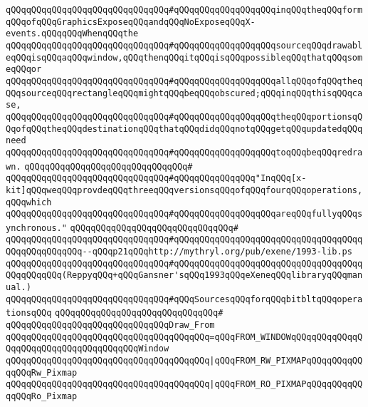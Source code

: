 \verb|qQQqqQQqqQQqqQQqqQQqqQQqqQQqqQQq#qQQqqQQqqQQqqQQqqQQqinqQQqtheqQQqformqQQqofqQQqGraphicsExposeqQQqandqQQqNoExposeqQQqX-events.qQQqqQQqWhenqQQqthe|\newline
\verb|qQQqqQQqqQQqqQQqqQQqqQQqqQQqqQQq#qQQqqQQqqQQqqQQqqQQqsourceqQQqdrawableqQQqisqQQqaqQQqwindow,qQQqthenqQQqitqQQqisqQQqpossibleqQQqthatqQQqsomeqQQqor|\newline
\verb|qQQqqQQqqQQqqQQqqQQqqQQqqQQqqQQq#qQQqqQQqqQQqqQQqqQQqallqQQqofqQQqtheqQQqsourceqQQqrectangleqQQqmightqQQqbeqQQqobscured;qQQqinqQQqthisqQQqcase,|\newline
\verb|qQQqqQQqqQQqqQQqqQQqqQQqqQQqqQQq#qQQqqQQqqQQqqQQqqQQqtheqQQqportionsqQQqofqQQqtheqQQqdestinationqQQqthatqQQqdidqQQqnotqQQqgetqQQqupdatedqQQqneed|\newline
\verb|qQQqqQQqqQQqqQQqqQQqqQQqqQQqqQQq#qQQqqQQqqQQqqQQqqQQqtoqQQqbeqQQqredrawn.|\newline
\verb|qQQqqQQqqQQqqQQqqQQqqQQqqQQqqQQq#|\newline
\verb|qQQqqQQqqQQqqQQqqQQqqQQqqQQqqQQq#qQQqqQQqqQQqqQQq"InqQQq[x-kit]qQQqweqQQqprovdeqQQqthreeqQQqversionsqQQqofqQQqfourqQQqoperations,qQQqwhich|\newline
\verb|qQQqqQQqqQQqqQQqqQQqqQQqqQQqqQQq#qQQqqQQqqQQqqQQqqQQqareqQQqfullyqQQqsynchronous."|\newline
\verb|qQQqqQQqqQQqqQQqqQQqqQQqqQQqqQQq#|\newline
\verb|qQQqqQQqqQQqqQQqqQQqqQQqqQQqqQQq#qQQqqQQqqQQqqQQqqQQqqQQqqQQqqQQqqQQqqQQqqQQqqQQqqQQq--qQQqp21qQQqhttp://mythryl.org/pub/exene/1993-lib.ps|\newline
\verb|qQQqqQQqqQQqqQQqqQQqqQQqqQQqqQQq#qQQqqQQqqQQqqQQqqQQqqQQqqQQqqQQqqQQqqQQqqQQqqQQq(ReppyqQQq+qQQqGansner'sqQQq1993qQQqeXeneqQQqlibraryqQQqmanual.)|\newline
\newline
\verb|qQQqqQQqqQQqqQQqqQQqqQQqqQQqqQQq#qQQqSourcesqQQqforqQQqbitbltqQQqoperationsqQQq|\newline
\verb|qQQqqQQqqQQqqQQqqQQqqQQqqQQqqQQq#|\newline
\verb|qQQqqQQqqQQqqQQqqQQqqQQqqQQqqQQqDraw_From|\newline
\verb|qQQqqQQqqQQqqQQqqQQqqQQqqQQqqQQqqQQqqQQq=qQQqFROM_WINDOWqQQqqQQqqQQqqQQqqQQqqQQqqQQqqQQqqQQqqQQqWindow|\newline
\verb|qQQqqQQqqQQqqQQqqQQqqQQqqQQqqQQqqQQqqQQq|\verb#|qQQqFROM_RW_PIXMAPqQQqqQQqqQQqqQQqRw_Pixmap#\newline
\verb|qQQqqQQqqQQqqQQqqQQqqQQqqQQqqQQqqQQqqQQq|\verb#|qQQqFROM_RO_PIXMAPqQQqqQQqqQQqqQQqRo_Pixmap#\newline
